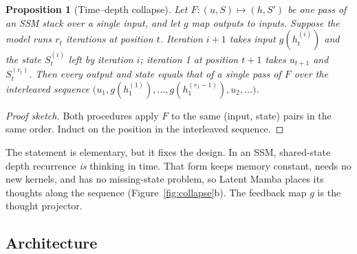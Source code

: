 \documentclass[10pt]{article}
\newtheorem{proposition}{Proposition}
\begin{document}
\begin{proposition}[Time--depth collapse]\label{prop:collapse}
Let $F : (u, S) \mapsto (h, S')$ be one pass of an SSM stack over a single input, and let $g$ map outputs to inputs. Suppose the model runs $r_t$ iterations at position $t$. Iteration $i{+}1$ takes input $g(h_t^{(i)})$ and the state $S_t^{(i)}$ left by iteration $i$; iteration 1 at position $t{+}1$ takes $u_{t+1}$ and $S_t^{(r_t)}$. Then every output and state equals that of a single pass of $F$ over the interleaved sequence $\big(u_1, g(h_1^{(1)}), \dots, g(h_1^{(r_1-1)}), u_2, \dots\big)$.
\end{proposition}
\begin{proof}[Proof sketch]
Both procedures apply $F$ to the same (input, state) pairs in the same order. Induct on the position in the interleaved sequence.
\end{proof}

The statement is elementary, but it fixes the design. In an SSM, shared-state depth recurrence \emph{is} thinking in time. That form keeps memory constant, needs no new kernels, and has no missing-state problem, so Latent Mamba places its thoughts along the sequence (Figure~\ref{fig:collapse}b). The feedback map $g$ is the thought projector.

\subsection{Architecture}
\end{document}
